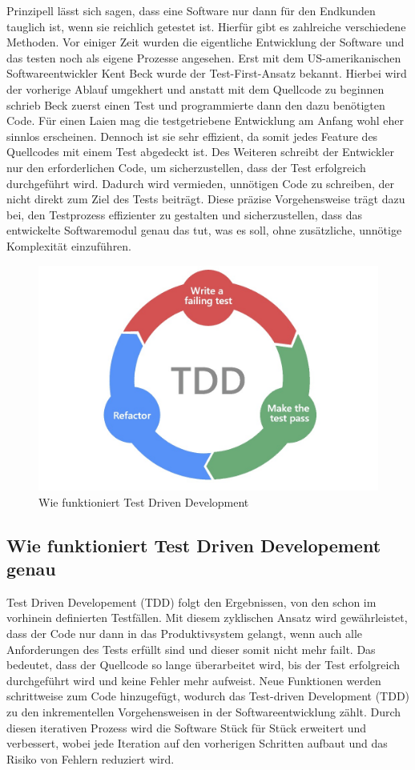 Prinzipell lässt sich sagen, dass eine Software nur dann für den Endkunden tauglich ist, wenn sie reichlich getestet ist. Hierfür gibt es zahlreiche verschiedene Methoden. Vor einiger Zeit wurden die eigentliche Entwicklung der Software und das testen noch als eigene Prozesse angesehen. Erst mit dem US-amerikanischen Softwareentwickler Kent Beck wurde der Test-First-Ansatz bekannt. Hierbei wird der vorherige Ablauf umgekhert und anstatt mit dem Quellcode zu beginnen schrieb Beck zuerst einen Test und programmierte dann den dazu benötigten Code. Für einen Laien mag die testgetriebene Entwicklung am Anfang wohl eher sinnlos erscheinen. Dennoch ist sie sehr effizient, da somit jedes Feature des Quellcodes mit einem Test abgedeckt ist. Des Weiteren schreibt der Entwickler nur den erforderlichen Code, um sicherzustellen, dass der Test erfolgreich durchgeführt wird. Dadurch wird vermieden, unnötigen Code zu schreiben, der nicht direkt zum Ziel des Tests beiträgt. Diese präzise Vorgehensweise trägt dazu bei, den Testprozess effizienter zu gestalten und sicherzustellen, dass das entwickelte Softwaremodul genau das tut, was es soll, ohne zusätzliche, unnötige Komplexität einzuführen.

\begin{figure}
    \centering
    \includegraphics[width=0.5\linewidth]{pics/tdd.jpeg}
    \caption{Wie funktioniert Test Driven Development}
    \label{fig:enter-label}
\end{figure}

\subsection{Wie funktioniert Test Driven Developement genau}

Test Driven Developement (TDD) folgt den Ergebnissen, von den schon im vorhinein definierten Testfällen. Mit diesem zyklischen Ansatz wird gewährleistet, dass der Code nur dann in das Produktivsystem gelangt, wenn auch alle Anforderungen des Tests erfüllt sind und dieser somit nicht mehr failt. Das bedeutet, dass der Quellcode so lange überarbeitet wird, bis der Test erfolgreich durchgeführt wird und keine Fehler mehr aufweist. Neue Funktionen werden schrittweise zum Code hinzugefügt, wodurch das Test-driven Development (TDD) zu den inkrementellen Vorgehensweisen in der Softwareentwicklung zählt. Durch diesen iterativen Prozess wird die Software Stück für Stück erweitert und verbessert, wobei jede Iteration auf den vorherigen Schritten aufbaut und das Risiko von Fehlern reduziert wird.
\cite{Was_ist_TDD}

